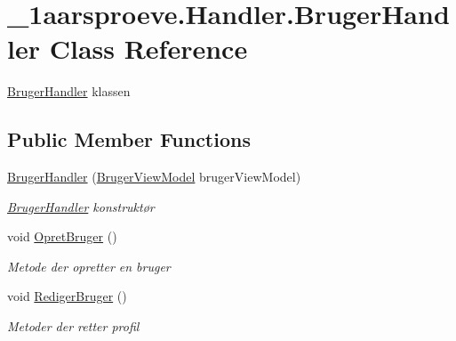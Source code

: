 \hypertarget{class__1aarsproeve_1_1_handler_1_1_bruger_handler}{}\section{\+\_\+1aarsproeve.\+Handler.\+Bruger\+Handler Class Reference}
\label{class__1aarsproeve_1_1_handler_1_1_bruger_handler}


\hyperlink{class__1aarsproeve_1_1_handler_1_1_bruger_handler}{Bruger\+Handler} klassen  


\subsection*{Public Member Functions}
\begin{DoxyCompactItemize}
\item 
\hyperlink{class__1aarsproeve_1_1_handler_1_1_bruger_handler_a6813940a8cecb133be93b4f0f0ac8b25}{Bruger\+Handler} (\hyperlink{class__1aarsproeve_1_1_view_model_1_1_bruger_view_model}{Bruger\+View\+Model} bruger\+View\+Model)
\begin{DoxyCompactList}\small\item\em \hyperlink{class__1aarsproeve_1_1_handler_1_1_bruger_handler}{Bruger\+Handler} konstruktør \end{DoxyCompactList}\item 
void \hyperlink{class__1aarsproeve_1_1_handler_1_1_bruger_handler_a5c577febb615dfdf0e881f575921c5e9}{Opret\+Bruger} ()
\begin{DoxyCompactList}\small\item\em Metode der opretter en bruger \end{DoxyCompactList}\item 
void \hyperlink{class__1aarsproeve_1_1_handler_1_1_bruger_handler_a8fc8be322229e3bb170c06ff10d4df3d}{Rediger\+Bruger} ()
\begin{DoxyCompactList}\small\item\em Metoder der retter profil \end{DoxyCompactList}\end{DoxyCompactItemize}
